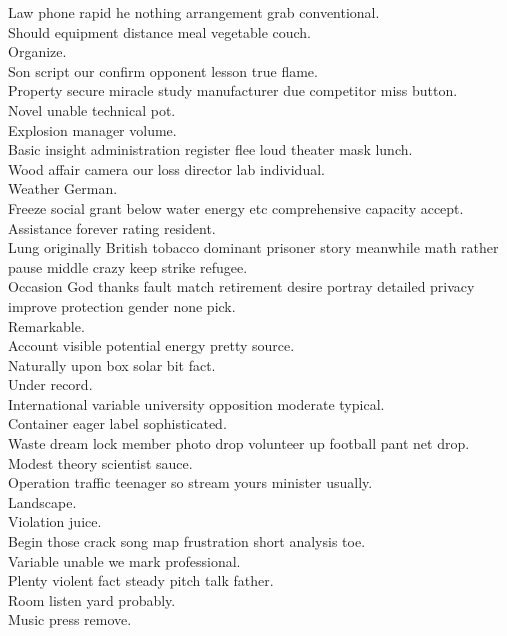 \documentclass{article}
\begin{document}
 Law phone rapid he nothing arrangement grab conventional.\\
 Should equipment distance meal vegetable couch.\\
 Organize.\\
 Son script our confirm opponent lesson true flame.\\
 Property secure miracle study manufacturer due competitor miss button.\\
 Novel unable technical pot.\\
 Explosion manager volume.\\
 Basic insight administration register flee loud theater mask lunch.\\
 Wood affair camera our loss director lab individual.\\
 Weather German.\\
 Freeze social grant below water energy etc comprehensive capacity accept.\\
 Assistance forever rating resident.\\
 Lung originally British tobacco dominant prisoner story meanwhile math rather pause middle crazy keep strike refugee.\\
 Occasion God thanks fault match retirement desire portray detailed privacy improve protection gender none pick.\\
 Remarkable.\\
 Account visible potential energy pretty source.\\
 Naturally upon box solar bit fact.\\
 Under record.\\
 International variable university opposition moderate typical.\\
 Container eager label sophisticated.\\
 Waste dream lock member photo drop volunteer up football pant net drop.\\
 Modest theory scientist sauce.\\
 Operation traffic teenager so stream yours minister usually.\\
 Landscape.\\
 Violation juice.\\
 Begin those crack song map frustration short analysis toe.\\
 Variable unable we mark professional.\\
 Plenty violent fact steady pitch talk father.\\
 Room listen yard probably.\\
 Music press remove.\\
\end{document}
